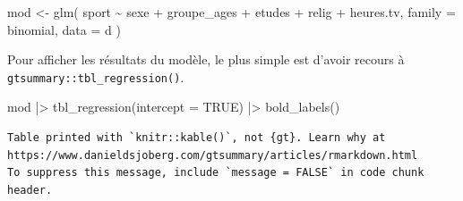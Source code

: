 \documentclass[
  letterpaper,
  DIV=11,
  numbers=noendperiod,
  oneside]{scrreprt}
\newenvironment{Shaded}{\begin{snugshade}}{\end{snugshade}}
\newcommand{\AttributeTok}[1]{\textcolor[rgb]{0.40,0.45,0.13}{#1}}
\newcommand{\ConstantTok}[1]{\textcolor[rgb]{0.56,0.35,0.01}{#1}}
\newcommand{\FunctionTok}[1]{\textcolor[rgb]{0.28,0.35,0.67}{#1}}
\newcommand{\NormalTok}[1]{\textcolor[rgb]{0.00,0.23,0.31}{#1}}
\newcommand{\OtherTok}[1]{\textcolor[rgb]{0.00,0.23,0.31}{#1}}
\newcommand{\SpecialCharTok}[1]{\textcolor[rgb]{0.37,0.37,0.37}{#1}}
\begin{document}
\begin{Shaded}
\begin{Highlighting}[]
\NormalTok{mod }\OtherTok{\textless{}{-}} \FunctionTok{glm}\NormalTok{(}
\NormalTok{  sport }\SpecialCharTok{\textasciitilde{}}\NormalTok{ sexe }\SpecialCharTok{+}\NormalTok{ groupe\_ages }\SpecialCharTok{+}\NormalTok{ etudes }\SpecialCharTok{+}\NormalTok{ relig }\SpecialCharTok{+}\NormalTok{ heures.tv,}
  \AttributeTok{family =}\NormalTok{ binomial,}
  \AttributeTok{data =}\NormalTok{ d}
\NormalTok{)}
\end{Highlighting}
\end{Shaded}

Pour afficher les résultats du modèle, le plus simple est d'avoir
recours à \texttt{gtsummary::tbl\_regression()}.

\begin{Shaded}
\begin{Highlighting}[]
\NormalTok{mod }\SpecialCharTok{|\textgreater{}} 
  \FunctionTok{tbl\_regression}\NormalTok{(}\AttributeTok{intercept =} \ConstantTok{TRUE}\NormalTok{) }\SpecialCharTok{|\textgreater{}} 
  \FunctionTok{bold\_labels}\NormalTok{()}
\end{Highlighting}
\end{Shaded}

\begin{verbatim}
Table printed with `knitr::kable()`, not {gt}. Learn why at
https://www.danieldsjoberg.com/gtsummary/articles/rmarkdown.html
To suppress this message, include `message = FALSE` in code chunk header.
\end{verbatim}
\end{document}
